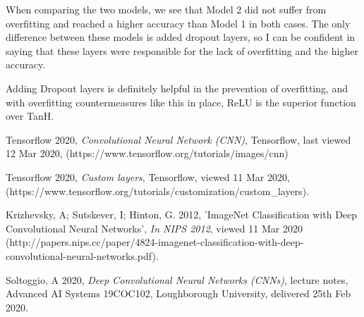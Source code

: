 \documentclass[a4paper, 11pt]{article}
\begin{document}
When comparing the two models, we see that Model 2 did not suffer from overfitting and reached a higher accuracy than Model 1 in both cases. The only difference between these models is added dropout layers, so I can be confident in saying that these layers were responsible for the lack of overfitting and the higher accuracy.

Adding Dropout layers is definitely helpful in the prevention of overfitting, and with overfitting countermeasures like this in place, ReLU is the superior function over TanH.

\begin{thebibliography}{9}

 Tensorflow 2020, \emph {Convolutional Neural Network (CNN)}, Tensorflow, last viewed 12 Mar 2020, (https://www.tensorflow.org/tutorials/images/cnn)

 Tensorflow 2020, \emph{Custom layers}, Tensorflow, viewed 11 Mar 2020, (https://www.tensorflow.org/tutorials/customization/custom\_layers).

 Krizhevsky, A; Sutskever, I; Hinton, G. 2012, 'ImageNet Classification with Deep Convolutional Neural Networks', \emph{In NIPS 2012}, viewed 11 Mar 2020 (http://papers.nips.cc/paper/4824-imagenet-classification-with-deep-convolutional-neural-networks.pdf).

 Soltoggio, A 2020, \emph{Deep Convolutional Neural Networks (CNNs)}, lecture notes, Advanced AI Systems 19COC102, Loughborough University, delivered 25th Feb 2020.

\end{thebibliography}
\end{document}
